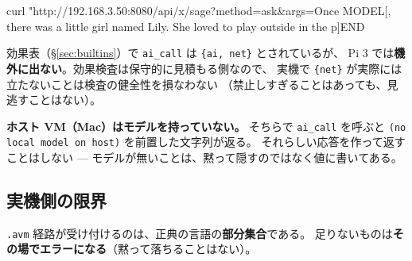 \documentclass[11pt,a4paper]{ltjsarticle}
\newcommand{\eff}[1]{\texttt{\{#1\}}}
\begin{document}
\begin{term}
curl "http://192.168.3.50:8080/api/x/sage?method=ask&args=Once%
MODEL[, there was a little girl named Lily. She loved to play outside in the p]END
\end{term}

効果表（\S\ref{sec:builtins}）で \texttt{ai\_call} は \eff{ai, net} とされているが、
Pi 3 では\textbf{機外に出ない}。効果検査は保守的に見積もる側なので、
実機で \eff{net} が実際には立たないことは検査の健全性を損なわない
（禁止しすぎることはあっても、見逃すことはない）。

\textbf{ホスト VM（Mac）はモデルを持っていない。}
そちらで \texttt{ai\_call} を呼ぶと
\texttt{(no local model on host)} を前置した文字列が返る。
それらしい応答を作って返すことはしない ---
モデルが無いことは、黙って隠すのではなく値に書いてある。

\subsection{実機側の限界}

\texttt{.avm} 経路が受け付けるのは、正典の言語の\textbf{部分集合}である。
足りないものは\textbf{その場でエラーになる}（黙って落ちることはない）。
\end{document}
